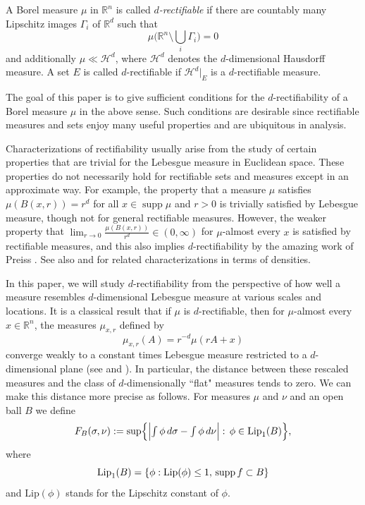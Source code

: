 \documentclass[11pt]{amsart}
\newcommand{\R}{{\mathbb R}}       %
\newcommand{\HH}{{\mathcal H}}
\newcommand{\supp}{\operatorname{supp}}
\newcommand{\Bl}{\color{blue}}
\theoremstyle{definition}
\theoremstyle{remark}
\numberwithin{equation}{section}
\newcommand{\xavi}[1]{}%
\def\cH{{\mathcal{H}}}
\def\Lip{\textrm{Lip}}
\newcommand{\jonas}[1]{}%
\begin{document}
\xavi{Added ``countably many" in the abstract}

A Borel measure $\mu$ in $\R^{n}$ is called {\it $d$-rectifiable} if there are countably many Lipschitz images $\Gamma_{i}$ of $\R^d$ such that 
\begin{equation}\label{e:rectifiable-support}
\mu\biggl(\R^{n}\setminus \bigcup_i \Gamma_{i}\biggr) =0
\end{equation}
and additionally $\mu\ll \cH^{d}$, where $\HH^d$ denotes the $d$-dimensional Hausdorff measure. A set $E$ is called $d$-rectifiable if $\cH^{d}|_{E}$ is a $d$-rectifiable measure.

The goal of this paper is to give sufficient conditions for the $d$-rectifiability of a  Borel measure $\mu$ in the above sense. Such conditions are desirable since rectifiable measures and sets enjoy many useful properties and are ubiquitous in analysis. %
\jonas{I removed a citation to harmonic measure here, thought it wasn't too relevant.}
Characterizations of rectifiability usually arise from the study of certain properties that are trivial for the Lebesgue measure in Euclidean space. These properties do not necessarily hold for rectifiable sets and measures except in an approximate way. For example, the property that a measure $\mu$ satisfies $\mu(B(x,r))=r^{d}$ for all $x\in \supp \mu$ and $r>0$ is trivially satisfied by Lebesgue measure, though not for general rectifiable measures. However, the weaker property that $\lim_{r\rightarrow 0} \frac{\mu(B(x,r))}{r^{d}}\in (0,\infty)$ for $\mu$-almost every $x$ is satisfied by rectifiable measures, and this also implies $d$-rectifiability by the amazing work of Preiss \cite{Pr87}. See also \cite{TT15} and \cite{Tol17} for related characterizations in terms of densities. 

In this paper, we will study $d$-rectifiability from the perspective of how well a measure resembles  $d$-dimensional Lebesgue measure at various scales and locations. It is a classical result that if $\mu$ is $d$-rectifiable, then for $\mu$-almost every $x\in \R^{n}$, the measures $\mu_{x,r}$ defined by 
\[
\mu_{x,r}(A) = r^{-d} \mu(rA+x)
\]
converge weakly to a constant times Lebesgue measure restricted to a $d$-dimensional plane (see \cite{DeL08} and \cite{Pr87}). In particular, the distance between these rescaled measures and the class of $d$-dimensionally ``flat" measures tends to zero. We can make this distance more precise as follows. For measures $\mu$ and $\nu$ and an open ball $B$ we define
$$F_B(\sigma,\nu):= \sup\Bigl\{ \Bigl|{\textstyle \int \phi \,d\sigma  -
	\int \phi\,d\nu}\Bigr|:\, \phi\in \Lip_{1}(B) \Bigr\},$$
where 
\[
\Lip_{1}(B)=\{\phi:{\rm Lip}(\phi) \leq1,\,\supp f\subset
B\}
\]
and $\Lip(\phi)$ stands for the Lipschitz constant of $\phi$.
\end{document}
